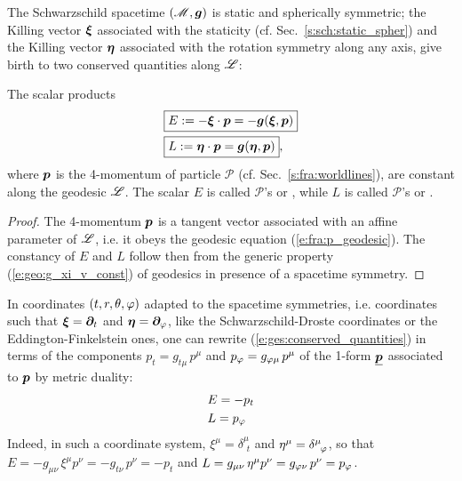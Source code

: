 The Schwarzschild spacetime $(\mathscr{M},\bm{g})$ is static and spherically symmetric; the
Killing vector $\bm{\xi}$ associated with the staticity (cf. Sec.~\ref{s:sch:static_spher})
and the Killing vector $\bm{\eta}$ associated with the rotation symmetry along any
axis, give birth to two conserved quantities along $\mathscr{L}$:
\begin{greybox}
The scalar products
\begin{subequations}
\label{e:ges:conserved_quantities}
\begin{align}
& \fbox{$\displaystyle E := - \bm{\xi}\cdot \bm{p} = - \bm{g}(\bm{\xi},\bm{p}) $} \label{e:ges:conserved_energy} \\
& \fbox{$\displaystyle L := \bm{\eta}\cdot \bm{p} = \bm{g}(\bm{\eta},\bm{p}) $} , \label{e:ges:conserved_angu_mom}
\end{align}
\end{subequations}
where $\bm{p}$ is the 4-momentum of particle
$\mathscr{P}$ (cf. Sec.~\ref{s:fra:worldlines}),
are constant along the geodesic $\mathscr{L}$.
The scalar $E$ is called $\mathscr{P}$'s
or ,
while $L$ is called $\mathscr{P}$'s 
or .
\end{greybox}
\begin{proof}
The 4-momentum $\bm{p}$ is a tangent vector associated with an affine parameter
of $\mathscr{L}$, i.e. it obeys the geodesic equation (\ref{e:fra:p_geodesic}).
The constancy of $E$ and $L$ follow then from the generic property (\ref{e:geo:g_xi_v_const})
of geodesics in presence of a spacetime symmetry.
\end{proof}
In coordinates $(t,r,\theta,\varphi)$ adapted to the spacetime symmetries,
i.e. coordinates such that $\bm{\xi} = \bm{\partial}_t$ and $\bm{\eta}=\bm{\partial}_\varphi$, like the Schwarzschild-Droste
coordinates or the Eddington-Finkelstein ones, one can rewrite
(\ref{e:ges:conserved_quantities})
in terms of the components $p_t = g_{t\mu} \, p^\mu$ and $p_\varphi = g_{\varphi\mu} \, p^\mu$
of the 1-form $\underline{\bm{p}}$ associated to $\bm{p}$ by metric duality:
\begin{subequations}
\begin{align}
& E = - p_t \\
& L = p_\varphi
\end{align}
\end{subequations}
Indeed, in such a coordinate system, $\xi^\mu =  \delta^\mu_{\ \, t}$
and $\eta^\mu = \delta^\mu_{\ \, \varphi}$, so that $E = -g_{\mu\nu} \, \xi^\mu p^\nu = -g_{t\nu} \, p^\nu = -p_t$
and $L = g_{\mu\nu} \, \eta^\mu p^\nu = g_{\varphi\nu} \, p^\nu = p_\varphi$.


